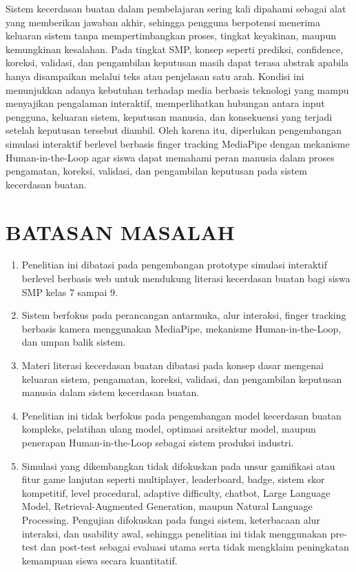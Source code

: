 \documentclass[12pt,oneside]{report}
\begin{document}
Sistem kecerdasan buatan dalam pembelajaran sering kali dipahami sebagai alat yang memberikan jawaban akhir, sehingga pengguna berpotensi menerima keluaran sistem tanpa mempertimbangkan proses, tingkat keyakinan, maupun kemungkinan kesalahan. Pada tingkat SMP, konsep seperti prediksi, confidence, koreksi, validasi, dan pengambilan keputusan masih dapat terasa abstrak apabila hanya disampaikan melalui teks atau penjelasan satu arah. Kondisi ini menunjukkan adanya kebutuhan terhadap media berbasis teknologi yang mampu menyajikan pengalaman interaktif, memperlihatkan hubungan antara input pengguna, keluaran sistem, keputusan manusia, dan konsekuensi yang terjadi setelah keputusan tersebut diambil. Oleh karena itu, diperlukan pengembangan simulasi interaktif berlevel berbasis finger tracking MediaPipe dengan mekanisme Human-in-the-Loop agar siswa dapat memahami peran manusia dalam proses pengamatan, koreksi, validasi, dan pengambilan keputusan pada sistem kecerdasan buatan.

\section{BATASAN MASALAH}
\label{sec:batasan-masalah}

\begin{enumerate}
    \item Penelitian ini dibatasi pada pengembangan prototype simulasi interaktif berlevel berbasis web untuk mendukung literasi kecerdasan buatan bagi siswa SMP kelas 7 sampai 9.
    \item Sistem berfokus pada perancangan antarmuka, alur interaksi, finger tracking berbasis kamera menggunakan MediaPipe, mekanisme Human-in-the-Loop, dan umpan balik sistem.
    \item Materi literasi kecerdasan buatan dibatasi pada konsep dasar mengenai keluaran sistem, pengamatan, koreksi, validasi, dan pengambilan keputusan manusia dalam sistem kecerdasan buatan.
    \item Penelitian ini tidak berfokus pada pengembangan model kecerdasan buatan kompleks, pelatihan ulang model, optimasi arsitektur model, maupun penerapan Human-in-the-Loop sebagai sistem produksi industri.
    \item Simulasi yang dikembangkan tidak difokuskan pada unsur gamifikasi atau fitur game lanjutan seperti multiplayer, leaderboard, badge, sistem skor kompetitif, level procedural, adaptive difficulty, chatbot, Large Language Model, Retrieval-Augmented Generation, maupun Natural Language Processing. Pengujian difokuskan pada fungsi sistem, keterbacaan alur interaksi, dan usability awal, sehingga penelitian ini tidak menggunakan pre-test dan post-test sebagai evaluasi utama serta tidak mengklaim peningkatan kemampuan siswa secara kuantitatif.
\end{enumerate}
\end{document}
